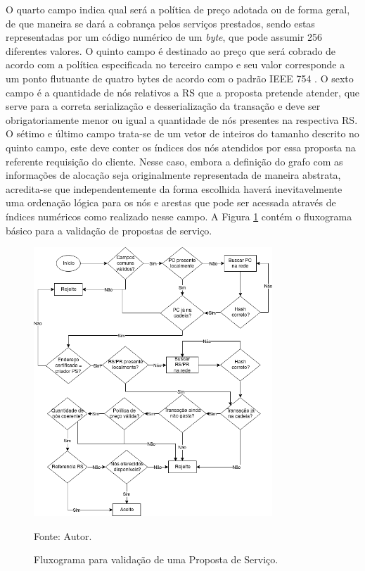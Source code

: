 %
O quarto campo indica qual será a política de preço adotada ou de forma geral, de que maneira se dará a cobrança pelos serviços prestados, sendo estas representadas por um código numérico de um \textit{byte}, que pode assumir 256 diferentes valores. O quinto campo é destinado ao preço que será cobrado de acordo com a política especificada no terceiro campo e seu valor corresponde a um ponto flutuante de quatro bytes de acordo com o padrão IEEE 754 \cite{nuvem_sla:padrao_i3e}. O sexto campo é a quantidade de nós relativos a \ac{RS} que a proposta pretende atender, que serve para a correta serialização e desserialização da transação e deve ser obrigatoriamente menor ou igual a quantidade de nós presentes na respectiva \ac{RS}. O sétimo e último campo trata-se de um vetor de inteiros do tamanho descrito no quinto campo, este deve conter os índices dos nós atendidos por essa proposta na referente requisição do cliente. Nesse caso, embora a definição do grafo com as informações de alocação seja originalmente representada de maneira abstrata, acredita-se que independentemente da forma escolhida haverá inevitavelmente uma ordenação lógica para os nós e arestas que pode ser acessada através de índices numéricos como realizado nesse campo. A Figura \ref{fig:validacao_ps} contém o fluxograma básico para a validação de propostas de serviço.

\begin{figure}[ht!]
\caption{Fluxograma para validação de uma Proposta de Serviço.}
\centering
\includegraphics[width=0.8\textwidth]{imagens/validacao_ps.png}
\begin{center}
        Fonte: Autor.
\end{center}
\label{fig:validacao_ps}
\end{figure}

